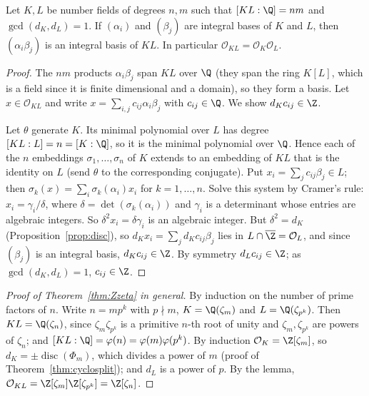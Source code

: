 \begin{lemma}\label{lem:compositum}
Let $K,L$ be number fields of degrees $n,m$ such that $[KL:\Q]=nm$ and $\gcd(d_K,d_L)=1$. If $(\alpha_i)$ and $(\beta_j)$ are
integral bases of $K$ and $L$, then $(\alpha_i\beta_j)$ is an integral basis of $KL$. In particular $\mathcal O_{KL}=\mathcal
O_K\mathcal O_L$.
\end{lemma}
\begin{proof}
The $nm$ products $\alpha_i\beta_j$ span $KL$ over $\Q$ (they span the ring $K[L]$, which is a field since it is finite
dimensional and a domain), so they form a basis. Let $x\in\mathcal O_{KL}$ and write $x=\sum_{i,j}c_{ij}\alpha_i\beta_j$
with $c_{ij}\in\Q$. We show $d_Kc_{ij}\in\Z$.

Let $\theta$ generate $K$. Its minimal polynomial over $L$ has degree $[KL:L]=n=[K:\Q]$, so it is the minimal polynomial over
$\Q$. Hence each of the $n$ embeddings $\sigma_1,\dots,\sigma_n$ of $K$ extends to an embedding of $KL$ that is the identity on
$L$ (send $\theta$ to the corresponding conjugate). Put $x_i=\sum_jc_{ij}\beta_j\in L$; then $\sigma_k(x)=\sum_i\sigma_k(\alpha_i)
x_i$ for $k=1,\dots,n$. Solve this system by Cramer's rule: $x_i=\gamma_i/\delta$, where $\delta=\det(\sigma_k(\alpha_i))$ and
$\gamma_i$ is a determinant whose entries are algebraic integers. So $\delta^2x_i=\delta\gamma_i$ is an algebraic integer.
But $\delta^2=d_K$ (Proposition~\ref{prop:disc}), so $d_Kx_i=\sum_j d_Kc_{ij}\beta_j$ lies in $L\cap\overline{\Z}=\mathcal O_L$, and
since $(\beta_j)$ is an integral basis, $d_Kc_{ij}\in\Z$. By symmetry $d_Lc_{ij}\in\Z$; as $\gcd(d_K,d_L)=1$, $c_{ij}\in\Z$.
\end{proof}

\begin{proof}[Proof of Theorem~\ref{thm:Zzeta} in general]
By induction on the number of prime factors of $n$. Write $n=mp^k$ with $p\nmid m$, $K=\Q(\zeta_m)$ and $L=\Q(\zeta_{p^k})$. Then
$KL=\Q(\zeta_n)$, since $\zeta_m\zeta_{p^k}$ is a primitive $n$-th root of unity and $\zeta_m,\zeta_{p^k}$ are powers of
$\zeta_n$; and $[KL:\Q]=\varphi(n)=\varphi(m)\varphi(p^k)$. By induction $\mathcal O_K=\Z[\zeta_m]$, so $d_K=\pm\operatorname{disc}
(\Phi_m)$, which divides a power of $m$ (proof of Theorem~\ref{thm:cyclosplit}); and $d_L$ is a power of $p$. By the lemma,
$\mathcal O_{KL}=\Z[\zeta_m]\Z[\zeta_{p^k}]=\Z[\zeta_n]$.
\end{proof}

